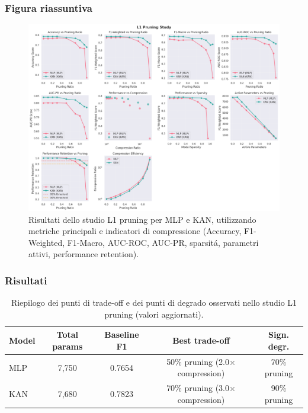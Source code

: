 \documentclass[a4paper,12pt]{report}
\begin{document}
	\subsubsection{Figura riassuntiva}
	\begin{figure}[H]
		\centering
		\includegraphics[width=1.0\textwidth]{img/abl_kanvsmlp_pm.png}
		\caption{Risultati dello studio L1 pruning per MLP e KAN, utilizzando metriche principali e indicatori di compressione (Accuracy, F1-Weighted, F1-Macro, AUC-ROC, AUC-PR, sparsitá, parametri attivi, performance retention).}
	\end{figure}
	
	\subsubsection{Risultati}
	\begin{table}[H]
		\centering
		\setlength{\tabcolsep}{4pt}
		\begin{tabular}{lcccc}
			\toprule
			\textbf{Model} & \textbf{Total params} & \textbf{Baseline F1} & \textbf{Best trade-off} & \textbf{Sign. degr.} \\
			\midrule
			MLP & 7,750   & 0.7654 & 50\% pruning (2.0$\times$ compression) & 70\% pruning \\
			KAN & 7,680   & 0.7823 & 70\% pruning (3.0$\times$ compression) & 90\% pruning \\
			\bottomrule
		\end{tabular}
		\caption{Riepilogo dei punti di trade-off e dei punti di degrado osservati nello studio L1 pruning (valori aggiornati).}
	\end{table}
	
\end{document}

